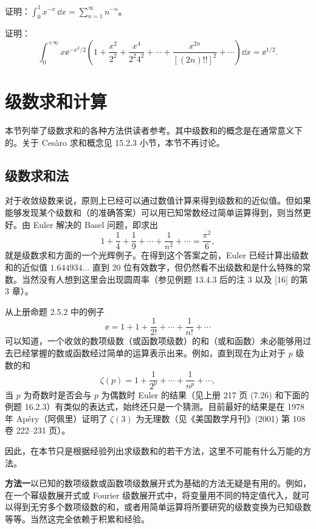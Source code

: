 \begin{xexercise}[4]
证明：$\displaystyle \int_0^1x^{-x}\,\dd x=\sum_{n=1}^{\infty}n^{-n}$。
\end{xexercise}

\begin{xexercise}[5]
证明：
\[
  \int_0^{+\infty}x\ee^{-x^2/2}
  \left(1+\frac{x^2}{2^2}+\frac{x^4}{2^2 4^2}+\cdots
  +\frac{x^{2n}}{[(2n)!!]^2}+\cdots\right)\dd x=\ee^{1/2}.
\]
\end{xexercise}

\section{级数求和计算}

本节列举了级数求和的各种方法供读者参考。其中级数和的概念是在通常意义下的。关于 Cesàro 求和概念见 15.2.3 小节，本节不再讨论。

\subsection{级数求和法}

对于收敛级数来说，原则上已经可以通过数值计算来得到级数和的近似值。但如果能够发现某个级数和（的准确答案）可以用已知常数经过简单运算得到，则当然更好。由 Euler 解决的 Basel 问题，即求出
\[
  1+\frac14+\frac19+\cdots+\frac1{n^2}+\cdots=\frac{\pi^2}{6},
\]
就是级数求和方面的一个光辉例子。在得到这个答案之前，Euler 已经计算出级数和的近似值 $1.644934\ldots$ 直到 20 位有效数字，但仍然看不出级数和是什么特殊的常数。当然没有人想到这里会出现圆周率（参见例题 13.4.3 后的注 3 以及 [16] 的第 3 章）。

从上册命题 2.5.2 中的例子
\[
  \ee=1+1+\frac1{2!}+\cdots+\frac1{n!}+\cdots
\]
可以知道，一个收敛的数项级数（或函数项级数）的和（或和函数）未必能够用过去已经掌握的数或函数经过简单的运算表示出来。例如，直到现在为止对于 $p$ 级数的和
\[
  \zeta(p)=1+\frac1{2^p}+\cdots+\frac1{n^p}+\cdots,
\]
当 $p$ 为奇数时是否会与 $p$ 为偶数时 Euler 的结果（见上册 217 页 (7.26) 和下面的例题 16.2.3）有类似的表达式，始终还只是一个猜测。目前最好的结果是在 1978 年 Apéry（阿佩里）证明了 $\zeta(3)$ 为无理数（见《美国数学月刊》(2001) 第 108 卷 222--231 页）。

因此，在本节只是根据经验列出求级数和的若干方法，这里不可能有什么万能的方法。

\textbf{方法一}\quad 以已知的数项级数或函数项级数展开式为基础的方法无疑是有用的。例如，在一个幂级数展开式或 Fourier 级数展开式中，将变量用不同的特定值代入，就可以得到无穷多个数项级数的和，或者用简单运算将所要研究的级数变换为已知级数等等。当然这完全依赖于积累和经验。

